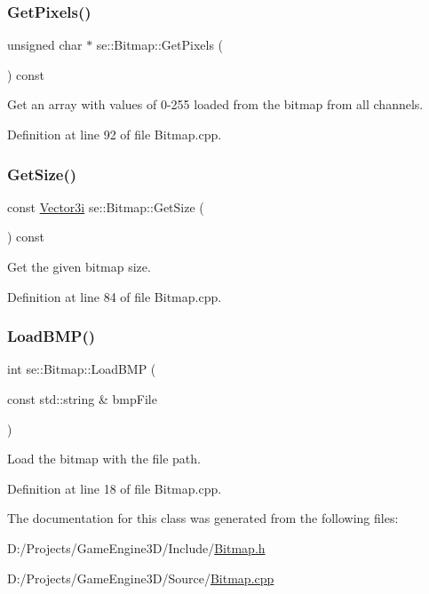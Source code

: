 \subsubsection{\texorpdfstring{Get\+Pixels()}{GetPixels()}}
{\footnotesize\ttfamily unsigned char $\ast$ se\+::\+Bitmap\+::\+Get\+Pixels (\begin{DoxyParamCaption}{ }\end{DoxyParamCaption}) const}

Get an array with values of 0-\/255 loaded from the bitmap from all channels. 

Definition at line 92 of file Bitmap.\+cpp.

\mbox{\label{classse_1_1_bitmap_a805adca2ccb528c6e694db84a51c7b66}} 
\subsubsection{\texorpdfstring{Get\+Size()}{GetSize()}}
{\footnotesize\ttfamily const \mbox{\hyperlink{namespacese_ada11715de7cf6e87b5dfb4611fe68d29}{Vector3i}} se\+::\+Bitmap\+::\+Get\+Size (\begin{DoxyParamCaption}{ }\end{DoxyParamCaption}) const}

Get the given bitmap size. 

Definition at line 84 of file Bitmap.\+cpp.

\mbox{\label{classse_1_1_bitmap_a76c7fbaf5d2049af44abf83fe40a854d}} 
\subsubsection{\texorpdfstring{Load\+B\+M\+P()}{LoadBMP()}}
{\footnotesize\ttfamily int se\+::\+Bitmap\+::\+Load\+B\+MP (\begin{DoxyParamCaption}\item[{const std\+::string \&}]{bmp\+File }\end{DoxyParamCaption})}

Load the bitmap with the file path. 

Definition at line 18 of file Bitmap.\+cpp.



The documentation for this class was generated from the following files\+:\begin{DoxyCompactItemize}
\item 
D\+:/\+Projects/\+Game\+Engine3\+D/\+Include/\mbox{\hyperlink{_bitmap_8h}{Bitmap.\+h}}\item 
D\+:/\+Projects/\+Game\+Engine3\+D/\+Source/\mbox{\hyperlink{_bitmap_8cpp}{Bitmap.\+cpp}}\end{DoxyCompactItemize}
